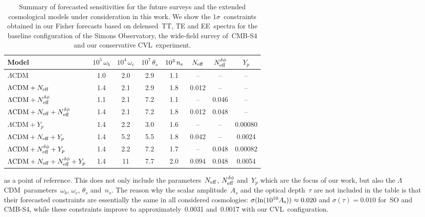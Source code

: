 \begin{subappendices}
\begin{table}
\begin{subtable}{\textwidth}
		\begin{tabular}{l c c c c c c c}
				\toprule
			Model											& {$10^{5}\,\omega_b$}	& {$10^{4}\,\omega_c$}	& {$10^{7}\,\theta_s$}	& {$10^{3}\,n_\mathrm{s}$}	& {$N_\mathrm{eff}$}	& {$N_\mathrm{eff}^{\delta\phi}$}	& {$Y_p$}	\\
				\midrule[0.065em]
			$\Lambda\mathrm{CDM}$							& 1.0						& 2.0						& 2.9						& 1.1				& {--}		& {--}			& {--}		\\
			$\Lambda\mathrm{CDM} + N_\mathrm{eff}$					& 1.4						& 2.1						& 2.9						& 1.8				& 0.012		& {--} 			& {--}		\\
			$\Lambda\mathrm{CDM} + N_\mathrm{eff}^{\delta\phi}$					& 1.1						& 2.1						& 7.2						& 1.1				& {--}		& 0.046			& {--}		\\
			$\Lambda\mathrm{CDM} + N_\mathrm{eff} + N_\mathrm{eff}^{\delta\phi}$			& 1.4						& 2.1						& 7.2						& 1.8				& 0.012		& 0.048			& {--}		\\
			$\Lambda\mathrm{CDM} + Y_p$						& 1.4						& 2.2						& 3.0						& 1.6				& {--}		& {--}			& 0.00080	\\
			$\Lambda\mathrm{CDM} + N_\mathrm{eff} + Y_p$				& 1.4						& 5.2						& 5.5						& 1.8				& 0.042		& {--} 			& 0.0024	\\
			$\Lambda\mathrm{CDM} + N_\mathrm{eff}^{\delta\phi} + Y_p$			& 1.4						& 2.2						& 7.2						& 1.7				& {--}		& 0.048			& 0.00082	\\
			$\Lambda\mathrm{CDM} + N_\mathrm{eff} + N_\mathrm{eff}^{\delta\phi} + Y_p$	& 1.4						& 11						& 7.7						& 2.0				& 0.094		& 0.048			& 0.0054	\\
				\bottomrule
		\end{tabular}
	
		\caption[Comprehensive forecasted sensitivities for future CMB surveys]{Cosmic-variance-limited experiment}
\end{subtable}
	\caption[Forecasted sensitivities for future CMB surveys]{Summary of forecasted sensitivities for the future surveys and the extended cosmological models under consideration in this work. We show the $1\sigma$~constraints obtained in our Fisher forecasts based on delensed~TT, TE and EE~spectra for the baseline configuration of the Simons Observatory, the wide-field survey of~\mbox{CMB-S4} and our conservative CVL~experiment.}
	\label{ch12-tab:forecasts_all}
\end{table}
as a point of reference. This does not only include the parameters~$N_\mathrm{eff}$, $N_\mathrm{eff}^{\delta\phi}$ and~$Y_p$ which are the focus of our work, but also the $\Lambda$CDM~parameters~$\omega_b$, $\omega_c$, $\theta_s$ and~$n_s$. The reason why the scalar amplitude~$A_s$ and the optical depth~$\tau$ are not included in the table is that their forecasted constraints are essentially the same in all considered cosmologies: $\sigma(\ln(10^{10}A_\mathrm{s})) \approx 0.020$ and $\sigma(\tau) = 0.010$ for~SO and \mbox{CMB-S4}, while these constraints improve to approximately~0.0031 and~0.0017 with our CVL~configuration.


\end{subappendices}

